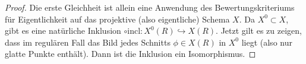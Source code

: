 \documentclass[german, bibliography=totoc]{scrreprt}
\begin{document}
\begin{Korollar}
  \begin{proof}
    Die erste Gleichheit ist allein eine Anwendung des
    Bewertungskriteriums für Eigentlichkeit auf das projektive (also
    eigentliche) Schema $X$.
    Da $X^0\subset X$, gibt es eine natürliche Inklusion
    $\circ \text{incl}\colon X^0(R)\hookrightarrow X(R)$.
    Jetzt gilt es zu zeigen, dass im regulären Fall das Bild jedes
    Schnitts $\phi\in X(R)$ in $X^0$ liegt (also nur glatte Punkte
    enthält). Dann ist die Inklusion ein Isomorphismus.
    

\end{proof}
\end{Korollar}
\end{document}
